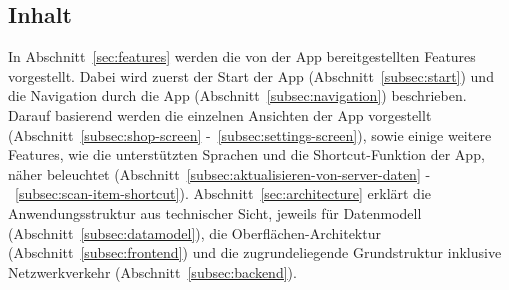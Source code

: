 \subsection{Inhalt}\label{subsec:inhalt}

In Abschnitt~\ref{sec:features} werden die von der App bereitgestellten Features vorgestellt.
Dabei wird zuerst der Start der App (Abschnitt~\ref{subsec:start}) und die Navigation durch die App (Abschnitt~\ref{subsec:navigation}) beschrieben.
Darauf basierend werden die einzelnen Ansichten der App vorgestellt (Abschnitt~\ref{subsec:shop-screen} -~\ref{subsec:settings-screen}), sowie einige weitere Features, wie die unterstützten Sprachen und die Shortcut-Funktion der App, näher beleuchtet (Abschnitt~\ref{subsec:aktualisieren-von-server-daten} -~\ref{subsec:scan-item-shortcut}).
Abschnitt~\ref{sec:architecture} erklärt die Anwendungsstruktur aus technischer Sicht, jeweils für Datenmodell (Abschnitt~\ref{subsec:datamodel}), die Oberflächen-Architektur (Abschnitt~\ref{subsec:frontend}) und die zugrundeliegende Grundstruktur inklusive Netzwerkverkehr (Abschnitt~\ref{subsec:backend}).
